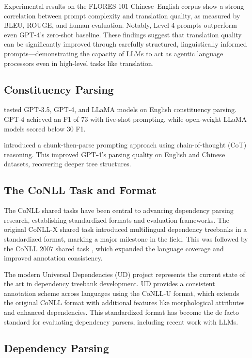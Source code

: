Experimental results on the FLORES-101 Chinese--English corpus show a strong correlation between prompt complexity and translation quality, as measured by BLEU, ROUGE, and human evaluation. Notably, Level 4 prompts outperform even GPT-4's zero-shot baseline. These findings suggest that translation quality can be significantly improved through carefully structured, linguistically informed prompts—demonstrating the capacity of LLMs to act as agentic language processors even in high-level tasks like translation.

\subsection{Constituency Parsing}

\citet{bai2023llmconst} tested GPT-3.5, GPT-4, and LLaMA models on English constituency parsing. GPT-4 achieved an F1 of 73 with five-shot prompting, while open-weight LLaMA models scored below 30 F1.

\citet{tian2024chunkprompt} introduced a chunk-then-parse prompting approach using chain-of-thought (CoT) reasoning. This improved GPT-4's parsing quality on English and Chinese datasets, recovering deeper tree structures.

\subsection{The CoNLL Task and Format}

The CoNLL shared tasks have been central to advancing dependency parsing research, establishing standardized formats and evaluation frameworks. The original CoNLL-X shared task \citep{buchholz2006conll} introduced multilingual dependency treebanks in a standardized format, marking a major milestone in the field. This was followed by the CoNLL 2007 shared task \citep{nivre2007conll}, which expanded the language coverage and improved annotation consistency.

The modern Universal Dependencies (UD) project \citep{nivre2016universal} represents the current state of the art in dependency treebank development. UD provides a consistent annotation scheme across languages using the CoNLL-U format, which extends the original CoNLL format with additional features like morphological attributes and enhanced dependencies. This standardized format has become the de facto standard for evaluating dependency parsers, including recent work with LLMs.

\subsection{Dependency Parsing}

